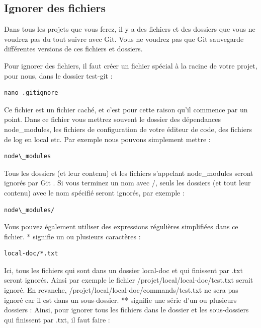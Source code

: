 \documentclass{article}
\begin{document}
\subsection{Ignorer des fichiers}
Dans tous les projets que vous ferez, il y a des fichiers et des dossiers que vous ne voudrez pas du tout suivre avec Git. Vous ne voudrez pas que {\color{blue} Git}  sauvegarde différentes versions de ces fichiers et dossiers.

Pour ignorer des fichiers, il faut créer un fichier spécial à la racine de votre projet, pour nous, dans le dossier {\color{blue} test-git} :

\begin{verbatim}
nano .gitignore
\end{verbatim}

Ce fichier est un fichier caché, et c'est pour cette raison qu'il commence par un point. Dans ce fichier vous mettrez souvent le dossier des dépendances {\color{blue} node\_modules}, les fichiers de configuration de votre éditeur de code, des fichiers de log en local etc. Par exemple nous pouvons simplement mettre :

\begin{verbatim}
node\_modules
\end{verbatim}

Tous les dossiers (et leur contenu) et les fichiers s'appelant {\color{blue}node\_modules} seront ignorés par {\color{blue} Git} . Si vous terminez un nom avec /, seuls les dossiers (et tout leur contenu) avec le nom spécifié seront ignorés, par exemple :

\begin{verbatim}
node\_modules/
\end{verbatim}

Vous pouvez également utiliser des expressions régulières simplifiées dans ce fichier. {\color{blue} *} signifie un ou plusieurs caractères :

\begin{verbatim}
local-doc/*.txt
\end{verbatim}

Ici, tous les fichiers qui sont dans un dossier {\color{blue}local-doc} et qui finissent par {\color{blue}.txt} seront ignorés. Ainsi par exemple le fichier {\color{blue}/projet/local/local-doc/test.txt} serait ignoré. En revanche, {\color{blue}/projet/local/local-doc/commands/test.txt} ne sera pas ignoré car il est dans un sous-dossier. {\color{blue}**} signifie une série d'un ou plusieurs dossiers : Ainsi, pour ignorer tous les fichiers dans le dossier et les sous-dossiers qui finissent par {\color{blue}.txt}, il faut faire :
\end{document}
